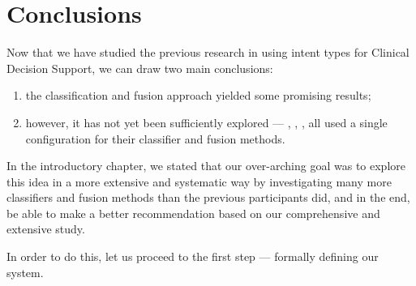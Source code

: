 \section{Conclusions}
Now that we have studied the previous research in
using intent types for Clinical Decision Support, we can draw two main conclusions:
\begin{enumerate}
 \item the classification and fusion approach yielded some promising results;
 \item however, it has not yet been sufficiently explored --- \cite{choi}, \cite{FDUMedSearch}, \cite{soldani}, \cite{limsi2015}
 all used a single configuration for their classifier and fusion methods.
\end{enumerate}

In the introductory chapter, we stated that our over-arching goal was to
explore this idea in a more extensive and systematic way by investigating
many more classifiers and fusion methods than the previous participants did, and in the end,
be able to make a better recommendation based on our comprehensive and extensive study.

In order to do this, let us proceed to the first step --- formally defining our system.


